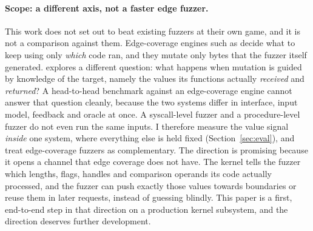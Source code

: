 \documentclass{article}
\begin{document}
\paragraph{Scope: a different axis, not a faster edge fuzzer.} This work does
not set out to beat existing fuzzers at their own game, and it is not a
comparison against them. Edge-coverage engines such as \syzkaller decide what
to keep using only \emph{which} code ran, and they mutate only bytes that the
fuzzer itself generated. \toolname explores a different question: what
happens when mutation is guided by knowledge of the target, namely the values
its functions actually \emph{received} and \emph{returned}? A head-to-head
benchmark against an edge-coverage engine cannot answer that question
cleanly, because the two systems differ in interface, input model, feedback
and oracle at once. A syscall-level fuzzer and a procedure-level fuzzer do not
even run the same inputs. I therefore measure the value signal \emph{inside}
one system, where everything else is held fixed (Section~\ref{sec:eval}), and
treat edge-coverage fuzzers as complementary. The direction is promising
because it opens a channel that edge coverage does not have. The kernel tells
the fuzzer which lengths, flags, handles and comparison operands its code
actually processed, and the fuzzer can push exactly those values towards
boundaries or reuse them in later requests, instead of guessing blindly. This
paper is a first, end-to-end step in that direction on a production kernel
subsystem, and the direction deserves further development.
\end{document}
